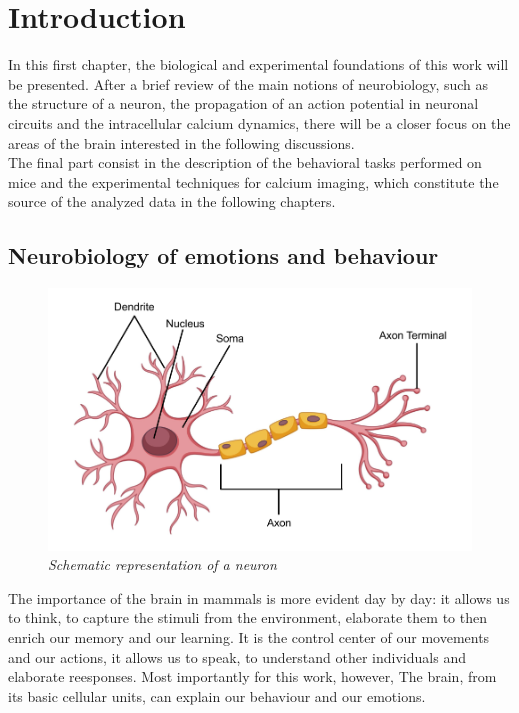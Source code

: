 \documentclass[a4paper]{article}
\begin{document}
	\clearpage
	
	\clearpage
	
	\section{Introduction}
	
	
	In this first chapter, the biological and experimental foundations of this work will be presented. After a brief review of the main notions of neurobiology, such as the structure of a neuron, the propagation of an action potential in neuronal circuits and the intracellular calcium dynamics, there will be a closer focus on the areas of the brain interested in the following discussions.\\
	The final part consist in the description of the behavioral tasks performed on mice and the experimental techniques for calcium imaging, which constitute the source of the analyzed data in the following chapters.
	
	\subsection{Neurobiology of emotions and behaviour}
	
	\begin{figure}[H]
		\begin{center}
			\includegraphics[scale=.25]{neuron.png} 
		\end{center} 
		\caption{\textit{Schematic representation of a neuron}}
		
	\end{figure}
	
	The importance of the brain in mammals is more evident day by day: it allows us to think,  to capture the stimuli from the environment, elaborate them to then enrich our memory and  our learning. It is the control center of our movements and our actions, it allows us to speak, to understand other individuals and elaborate reesponses. Most importantly for this work, however, The brain, from its basic cellular units, can explain our behaviour and our emotions. \\
	
\end{document}
